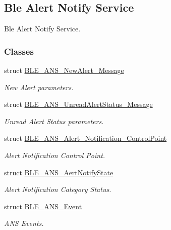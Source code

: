 \hypertarget{group___b_l_e___a_n_s}{}\subsection{Ble Alert Notify Service}
\label{group___b_l_e___a_n_s}


Ble Alert Notify Service.  


\subsubsection*{Classes}
\begin{DoxyCompactItemize}
\item 
struct \hyperlink{struct_b_l_e___a_n_s___new_alert___message}{B\+L\+E\+\_\+\+A\+N\+S\+\_\+\+New\+Alert\+\_\+\+Message}
\begin{DoxyCompactList}\small\item\em New Alert parameters. \end{DoxyCompactList}\item 
struct \hyperlink{struct_b_l_e___a_n_s___unread_alert_status___message}{B\+L\+E\+\_\+\+A\+N\+S\+\_\+\+Unread\+Alert\+Status\+\_\+\+Message}
\begin{DoxyCompactList}\small\item\em Unread Alert Status parameters. \end{DoxyCompactList}\item 
struct \hyperlink{struct_b_l_e___a_n_s___alert___notification___control_point}{B\+L\+E\+\_\+\+A\+N\+S\+\_\+\+Alert\+\_\+\+Notification\+\_\+\+Control\+Point}
\begin{DoxyCompactList}\small\item\em Alert Notification Control Point. \end{DoxyCompactList}\item 
struct \hyperlink{struct_b_l_e___a_n_s___aert_notify_state}{B\+L\+E\+\_\+\+A\+N\+S\+\_\+\+Aert\+Notify\+State}
\begin{DoxyCompactList}\small\item\em Alert Notification Category Status. \end{DoxyCompactList}\item 
struct \hyperlink{struct_b_l_e___a_n_s___event}{B\+L\+E\+\_\+\+A\+N\+S\+\_\+\+Event}
\begin{DoxyCompactList}\small\item\em A\+NS Events. \end{DoxyCompactList}\end{DoxyCompactItemize}
